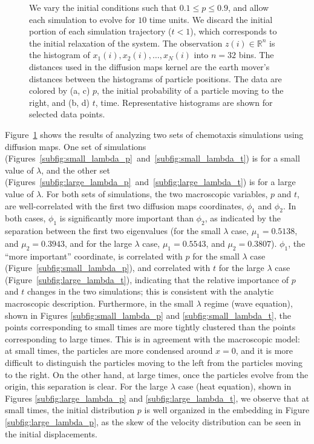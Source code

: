 \documentclass[preprint]{elsarticle}
\begin{document}
\begin{figure}[t!]
{%
We vary the initial conditions such that $0.1 \le p  \le 0.9$, and allow each simulation to evolve for $10$ time units.
%
We discard the initial portion of each simulation trajectory ($t < 1$), which corresponds to the initial relaxation of the system.
%
The observation $z(i) \in \mathbb{R}^n$ is the histogram of $x_1(i), x_2(i), \dots, x_N(i)$ into $n = 32$ bins.
%
The distances used in the diffusion maps kernel are the earth mover's distances between the histograms of particle positions. The data are colored by (a, c) $p$, the initial probability of a particle moving to the right, and (b, d) $t$, time. Representative histograms are shown for selected data points.}
\label{fig:dmaps_embed_emd}
\end{figure}


Figure~\ref{fig:dmaps_embed_emd} shows the results of analyzing two sets of chemotaxis simulations using diffusion maps. 
%
One set of simulations (Figures~\ref{subfig:small_lambda_p}~and~\ref{subfig:small_lambda_t}) is for a small value of $\lambda$, and the other set (Figures~\ref{subfig:large_lambda_p}~and~\ref{subfig:large_lambda_t}) is for a large value of $\lambda$. 
%
For both sets of simulations, the two macroscopic variables, $p$ and $t$, are well-correlated with the first two diffusion maps coordinates, $\phi_1$ and $\phi_2$. 
%
In both cases, $\phi_1$ is significantly more important than $\phi_2$, as indicated by the separation between the first two eigenvalues (for the small $\lambda$ case, $\mu_1 = 0.5138$, and $\mu_2 = 0.3943$, and for the large $\lambda$ case, $\mu_1 = 0.5543$, and $\mu_2 = 0.3807$).
%
$\phi_1$, the ``more important'' coordinate, is correlated with $p$ for the small $\lambda$ case (Figure~\ref{subfig:small_lambda_p}), and correlated with $t$ for the large $\lambda$ case (Figure~\ref{subfig:large_lambda_t}), indicating that the relative importance of $p$ and $t$ changes in the two simulations;
this is consistent with the analytic macroscopic description. 
%
Furthermore, in the small $\lambda$ regime (wave equation), shown in Figures \ref{subfig:small_lambda_p} and \ref{subfig:small_lambda_t}, the points corresponding to small times are more tightly clustered than the points corresponding to large times.
%
This is in agreement with the macroscopic model: at small times, the particles are more condensed around $x=0$, and it is more difficult to distinguish the particles moving to the left from the particles moving to the right. 
%
On the other hand, at large times, once the particles evolve from the origin, this separation is clear.  
%
For the large $\lambda$ case (heat equation), shown in Figures \ref{subfig:large_lambda_p} and \ref{subfig:large_lambda_t}, we observe that at small times, the initial distribution $p$ is well organized in the embedding in Figure \ref{subfig:large_lambda_p}, as the skew of the velocity distribution can be seen in the initial displacements.
\end{document}

